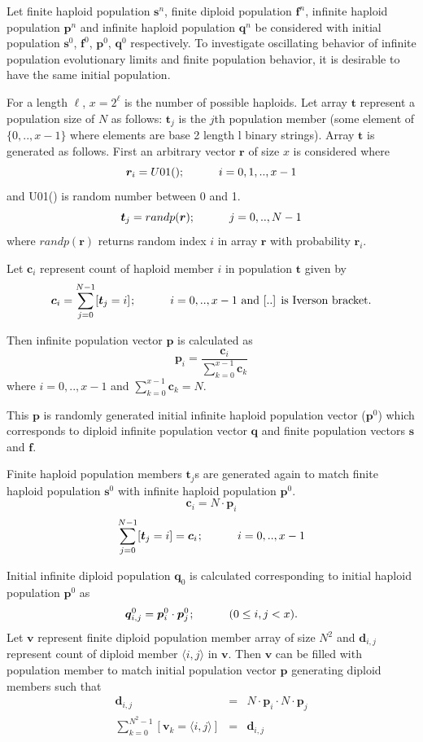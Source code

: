 Let finite haploid population $\bm{s}^n$, finite diploid population $\bm{f}^n$, infinite haploid population $\bm{p}^n$ 
and infinite haploid population $\bm{q}^n$ be considered with initial population $\bm{s}^0$, $\bm{f}^0$,
$\bm{p}^0$, $\bm{q}^0$ respectively. To investigate oscillating behavior of infinite population evolutionary limits 
and finite population behavior, it is desirable to have the same initial population. 

For a length $\ell$, $x = 2^\ell$ is the number of possible haploids. Let array $\bm{t}$ represent a  
population size of $N$ as follows: $\bm{t}_j$ is the $j$th population member (some element of $\{0,..,x-1\}$ 
where elements are base 2 length l binary strings). Array $\bm{t}$ is generated as follows. 
First an arbitrary vector $\bm{r}$ of size $x$ is considered where
\[
\bm{r}_i = U01(); \hspace{30pt} {i = 0, 1,.., x-1}
\]
and U01() is random number between 0 and 1.
\[
\bm{t}_j = randp(\bm{r}) ; \hspace{30pt} {j = 0,.., N-1}
\]
where $randp(\bm{r})$ returns random index $i$ in array $\bm{r}$ with probability $\bm{r}_i$.

Let $\bm{c}_i$ represent count of haploid member $i$ in population $\bm{t}$ given by
\[
\bm{c}_i = \sum \limits_{j=0}^{N-1} [\bm{t}_j = i]  \hspace{0.01in}; \hspace{30pt}  {i = 0,.., x-1} \text{ and  [..]  is  Iverson bracket.}
\]

Then infinite population vector $\bm{p}$ is calculated as
\[
\bm{p}_i = \frac{\bm{c}_i}{ \sum \limits_{k=0}^{x-1} \bm{c}_k }
\]
where $i = 0,.., x-1$ and $\sum \limits_{k=0}^{x-1} \bm{c}_k = N$.

This $\bm{p}$ is randomly generated initial infinite haploid population vector ($\bm{p}^0$) which corresponds to diploid infinite population vector $\bm{q}$ 
and finite population vectors $\bm{s}$ and $\bm{f}$.

Finite haploid population members $\bm{t}_j$s are generated again to match finite haploid population $\bm{s}^0$ with infinite haploid population $\bm{p}^0$.
\[
\bm{c}_i = N \cdot \bm{p}_i 
\]
\[
\sum \limits_{j=0}^{N-1} [\bm{t}_j = i] = \bm{c}_i  \hspace{0.01in}; \hspace{30pt}  {i = 0,.., x-1} 
\]

Initial infinite diploid population $\bm{q}_0$ is calculated corresponding to initial haploid population $\bm{p}^0$ as
\[
\bm{q}^0_{i,j} = \bm{p}^0_i \cdot \bm{p}^0_j  \hspace{0.01in}; \hspace{30pt}  (0 \leq i,j < x).
\]
Let $\bm{v}$ represent finite diploid population member array of size $N^2$ and $\bm{d}_{i,j}$ represent count of 
diploid member $\langle i,j \rangle$ in $\bm{v}$. Then $\bm{v}$ can be filled with population member to match 
initial population vector $\bm{p}$ generating diploid members such that
\begin{eqnarray*}
\bm{d}_{i,j} & = & N \cdot \bm{p}_i \cdot N \cdot \bm{p}_j  \\
\sum \limits_{k=0}^{N^2-1} [ \bm{v}_k = \langle i,j \rangle ] & = & \bm{d}_{i,j}
\end{eqnarray*}

